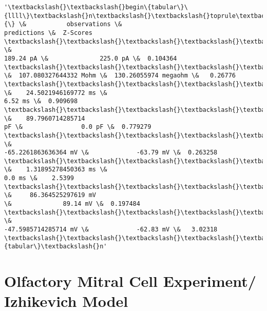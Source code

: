 \documentclass[11pt]{article}
\begin{document}
            \begin{tcolorbox}[breakable, size=fbox, boxrule=.5pt, pad at break*=1mm, opacityfill=0]
\begin{Verbatim}[commandchars=\\\{\}]
'\textbackslash{}\textbackslash{}begin\{tabular\}\{llll\}\textbackslash{}n\textbackslash{}\textbackslash{}toprule\textbackslash{}n\{\} \&           observations \&
predictions \&  Z-Scores \textbackslash{}\textbackslash{}\textbackslash{}\textbackslash{}\textbackslash{}n\textbackslash{}\textbackslash{}midrule\textbackslash{}nRheobaseTest                   \&
189.24 pA \&              225.0 pA \&  0.104364 \textbackslash{}\textbackslash{}\textbackslash{}\textbackslash{}\textbackslash{}nInputResistanceTest
\&  107.080327644332 Mohm \&  130.26055974 megaohm \&   0.26776
\textbackslash{}\textbackslash{}\textbackslash{}\textbackslash{}\textbackslash{}nTimeConstantTest               \&    24.5021946169772 ms \&
6.52 ms \&  0.909698 \textbackslash{}\textbackslash{}\textbackslash{}\textbackslash{}\textbackslash{}nCapacitanceTest                \&    89.7960714285714
pF \&                0.0 pF \&  0.779279 \textbackslash{}\textbackslash{}\textbackslash{}\textbackslash{}\textbackslash{}nRestingPotentialTest           \&
-65.2261863636364 mV \&             -63.79 mV \&  0.263258
\textbackslash{}\textbackslash{}\textbackslash{}\textbackslash{}\textbackslash{}nInjectedCurrentAPWidthTest     \&    1.31895278450363 ms \&
0.0 ms \&    2.5399 \textbackslash{}\textbackslash{}\textbackslash{}\textbackslash{}\textbackslash{}nInjectedCurrentAPAmplitudeTest \&     86.364525297619 mV
\&              89.14 mV \&  0.197484 \textbackslash{}\textbackslash{}\textbackslash{}\textbackslash{}\textbackslash{}nInjectedCurrentAPThresholdTest \&
-47.5985714285714 mV \&             -62.83 mV \&   3.02318
\textbackslash{}\textbackslash{}\textbackslash{}\textbackslash{}\textbackslash{}n\textbackslash{}\textbackslash{}bottomrule\textbackslash{}n\textbackslash{}\textbackslash{}end\{tabular\}\textbackslash{}n'
\end{Verbatim}
\end{tcolorbox}
        
    \hypertarget{olfactory-mitral-cell-experiment-izhikevich-model}{%
\section{Olfactory Mitral Cell Experiment/ Izhikevich
Model}\label{olfactory-mitral-cell-experiment-izhikevich-model}}
\end{document}
